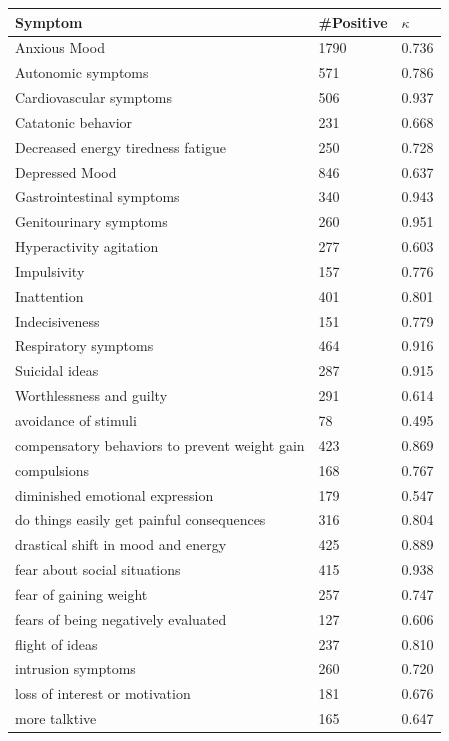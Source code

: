 \begin{table}[ht]
    \small
    \centering
    \begin{tabular}{m{4.8cm}m{0.9cm}m{0.9cm}}
    \hline
    Symptom & \#Positive & $\kappa$ \\
    \hline
    Anxious Mood 	&	1790	&	0.736 	\\
    Autonomic symptoms	&	571	&	0.786 	\\
    Cardiovascular symptoms	&	506	&	0.937 	\\
    Catatonic behavior	&	231	&	0.668 	\\
    Decreased energy tiredness fatigue	&	250	&	0.728 	\\
    Depressed Mood	&	846	&	0.637 	\\
    Gastrointestinal symptoms	&	340	&	0.943 	\\
    Genitourinary symptoms	&	260	&	0.951 	\\
    Hyperactivity agitation	&	277	&	0.603 	\\
    Impulsivity	&	157	&	0.776 	\\
    Inattention	&	401	&	0.801 	\\
    Indecisiveness	&	151	&	0.779 	\\
    Respiratory symptoms	&	464	&	0.916 	\\
    Suicidal ideas	&	287	&	0.915 	\\
    Worthlessness and guilty	&	291	&	0.614 	\\
    avoidance of stimuli	&	78	&	0.495 	\\
    compensatory behaviors to prevent weight gain	&	423	&	0.869 	\\
    compulsions	&	168	&	0.767 	\\
    diminished emotional expression	&	179	&	0.547 	\\
    do things easily get painful consequences	&	316	&	0.804 	\\
    drastical shift in mood and energy	&	425	&	0.889 	\\
    fear about social situations	&	415	&	0.938 	\\
    fear of gaining weight	&	257	&	0.747 	\\
    fears of being negatively evaluated	&	127	&	0.606 	\\
    flight of ideas	&	237	&	0.810 	\\
    intrusion symptoms	&	260	&	0.720 	\\
    loss of interest or motivation	&	181	&	0.676 	\\
    more talktive	&	165	&	0.647 	\\

\end{tabular}
\end{table}
